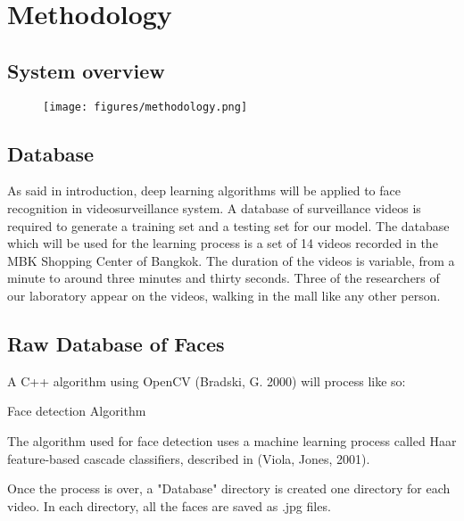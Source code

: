 \setlength{\footskip}{8mm}

\chapter{Methodology}
\label{ch:methodology}

\section{System overview}

\begin{figure}[t]
  \centering
  \texttt{[image: figures/methodology.png]}  
  \caption[A general representation of ]{}
  \label{fig:Methodology}
\end{figure}


\section{Database}
As said in introduction, deep learning algorithms will be applied to face recognition in videosurveillance system. A database of surveillance videos is required to generate a training set and a testing set for our model.
The database which will be used for the learning process is a set of 14 videos recorded in the MBK Shopping Center of Bangkok. The duration of the videos is variable, from a minute to around three minutes and thirty seconds. Three of the researchers of our laboratory appear on the videos, walking in the mall like any other person.

\section{Raw Database of Faces}

A C++ algorithm using OpenCV (Bradski, G. 2000) will process like so:

\begin{algorithm}[H]
 \caption{Face detection Algorithm}
\end{algorithm}

The algorithm used for face detection uses a machine learning process called Haar feature-based cascade classifiers, described in (Viola, Jones, 2001).

Once the process is over, a "Database" directory is created one directory for each video. In each directory, all the faces are saved as .jpg files.

